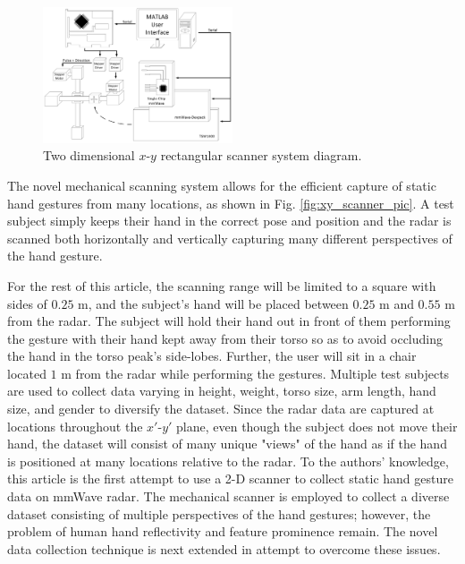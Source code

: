 \documentclass{ieeeaccess}
\begin{document}
\begin{figure}[h]
    \centering
    \includegraphics[width=0.5\textwidth]{smith2.png}
    \caption{Two dimensional $x$-$y$ rectangular scanner system diagram.}
    \label{fig:xy_scanner_system_diagram}
\end{figure}

The novel mechanical scanning system allows for the efficient capture of static hand gestures from many locations, as shown in Fig. \ref{fig:xy_scanner_pic}. A test subject simply keeps their hand in the correct pose and position and the radar is scanned both horizontally and vertically capturing many different perspectives of the hand gesture. 

For the rest of this article, the scanning range will be limited to a square with sides of $0.25$ m, and the subject's hand will be placed between $0.25$ m and $0.55$ m from the radar. The subject will hold their hand out in front of them performing the gesture with their hand kept away from their torso so as to avoid occluding the hand in the torso peak's side-lobes. Further, the user will sit in a chair located $1$ m from the radar while performing the gestures. Multiple test subjects are used to collect data varying in height, weight, torso size, arm length, hand size, and gender to diversify the dataset. Since the radar data are captured at locations throughout the $x'$-$y'$ plane, even though the subject does not move their hand, the dataset will consist of many unique "views" of the hand as if the hand is positioned at many locations relative to the radar. To the authors' knowledge, this article is the first attempt to use a 2-D scanner to collect static hand gesture data on mmWave radar. The mechanical scanner is employed to collect a diverse dataset consisting of multiple perspectives of the hand gestures; however, the problem of human hand reflectivity and feature prominence remain. The novel data collection technique is next extended in attempt to overcome these issues.
\end{document}
